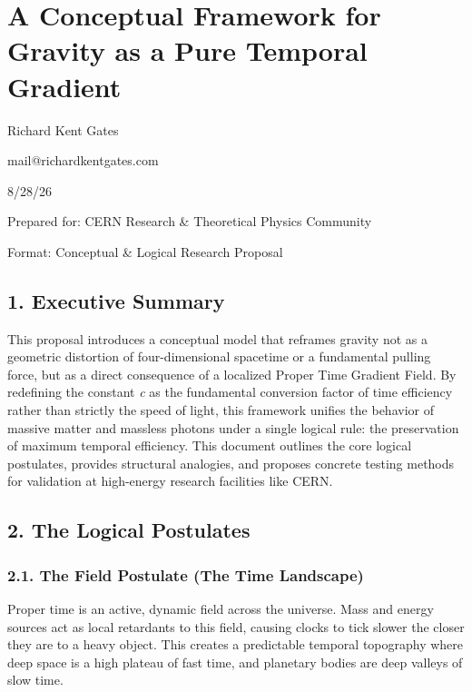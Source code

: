 \documentclass[
  10pt,
]{article}
\author{}
\date{}
\begin{document}
\hypertarget{a-conceptual-framework-for-gravity-as-a-pure-temporal-gradient}{%
\section{A Conceptual Framework for Gravity as a Pure Temporal
Gradient}\label{a-conceptual-framework-for-gravity-as-a-pure-temporal-gradient}}

Richard Kent Gates

mail@richardkentgates.com

8/28/26

Prepared for: CERN Research \& Theoretical Physics Community

Format: Conceptual \& Logical Research Proposal

\hypertarget{executive-summary}{%
\subsection{1. Executive Summary}\label{executive-summary}}

This proposal introduces a conceptual model that reframes gravity not as
a geometric distortion of four-dimensional spacetime or a fundamental
pulling force, but as a direct consequence of a localized Proper Time
Gradient Field. By redefining the constant \emph{c} as the fundamental
conversion factor of time efficiency rather than strictly the speed of
light, this framework unifies the behavior of massive matter and
massless photons under a single logical rule: the preservation of
maximum temporal efficiency. This document outlines the core logical
postulates, provides structural analogies, and proposes concrete testing
methods for validation at high-energy research facilities like CERN.

\hypertarget{the-logical-postulates}{%
\subsection{2. The Logical Postulates}\label{the-logical-postulates}}

\hypertarget{the-field-postulate-the-time-landscape}{%
\subsubsection{2.1. The Field Postulate (The Time
Landscape)}\label{the-field-postulate-the-time-landscape}}

Proper time is an active, dynamic field across the universe. Mass and
energy sources act as local retardants to this field, causing clocks to
tick slower the closer they are to a heavy object. This creates a
predictable \textquotesingle temporal topography\textquotesingle{} where
deep space is a high plateau of fast time, and planetary bodies are deep
valleys of slow time.
\end{document}
